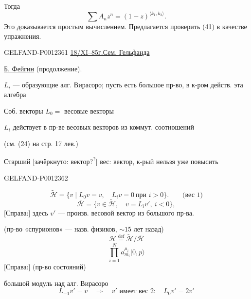 Тогда
\begin{equation*}
\sum A_n z^n=(1-z)^{\langle k_1,k_2\rangle}.
\tag{41}
\end{equation*}
Это доказывается простым вычислением. Предлагается проверить (41) в качестве упражнения.


\begin{GelfandAdjacentEvidence}{GELFAND-P001236}{1}
\underline{18/XI–85г.}\qquad \underline{Сем. Гельфанда}

\underline{Б. Фейгин} (продолжение).

$L_i$ — образующие алг. Вирасоро; пусть есть большое пр-во, в к-ром действ. эта алгебра

Соб. векторы $L_0=$ весовые векторы

$L_i$ действует в пр-ве весовых векторов из коммут. соотношений

(см. (24) на стр. 17 лев.)

Старший [зачёркнуто: вектор?\textsuperscript{?}] вес: вектор, к-рый нельзя уже повысить
\end{GelfandAdjacentEvidence}
\begin{GelfandAdjacentEvidence}{GELFAND-P001236}{2}

\begin{equation*}
\widetilde{\mathcal H}=\{v\mid L_0v=v,\quad L_iv=0\ \text{при }i>0\}.\qquad\text{(вес 1)}
\tag{1}
\end{equation*}
\begin{equation*}
\overline{\mathcal H}=\{v\in\widetilde{\mathcal H},\quad v=L_i v',\ i<0\},
\tag{2}
\end{equation*}
[Справа:] здесь $v'$ — произв. весовой вектор из большого пр-ва.

(пр-во «спурионов» — назв. физиков, $\sim15$ лет назад)
\begin{equation*}
\mathcal H\overset{\mathrm{def}}{=}\widetilde{\mathcal H}/\overline{\mathcal H}
\tag{3}
\end{equation*}
\begin{equation*}
\prod_{i=1}^N a_{m_i}^{\mu_i}|0,p\rangle
\tag{4}
\end{equation*}
[Справа:] (пр-во состояний)

большой модуль над алг. Вирасоро
\begin{equation*}
L_{-1}v'=v\quad\Rightarrow\quad v'\text{ имеет вес }2:\quad L_0v'=2v'
\tag{5}
\end{equation*}
\end{GelfandAdjacentEvidence}
